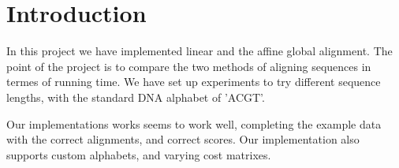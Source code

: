\section{Introduction}
In this project we have implemented linear and the affine global alignment. The point of the project is to compare the two methods of aligning sequences in termes of running time. We have set up experiments to try different sequence lengths, with the standard DNA alphabet of 'ACGT'.

Our implementations works seems to work well, completing the example data with the correct alignments, and correct scores. Our implementation also supports custom alphabets, and varying cost matrixes.